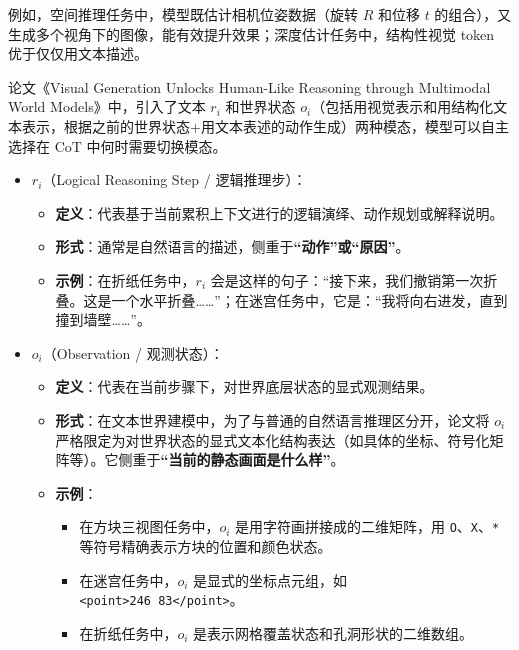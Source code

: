 例如，空间推理任务中，模型既估计相机位姿数据（旋转 \(R\) 和位移 \(t\) 的组合），又生成多个视角下的图像，能有效提升效果；深度估计任务中，结构性视觉 token 优于仅仅用文本描述。

论文《Visual Generation Unlocks Human-Like Reasoning through Multimodal World Models》中，引入了文本 \(r_i\) 和世界状态 \(o_i\)（包括用视觉表示和用结构化文本表示，根据之前的世界状态+用文本表述的动作生成）两种模态，模型可以自主选择在 CoT 中何时需要切换模态。

\begin{itemize}
\tightlist
\item
  \(r_i\)（Logical Reasoning Step / 逻辑推理步）：

  \begin{itemize}
  \tightlist
  \item
    \textbf{定义}：代表基于当前累积上下文进行的逻辑演绎、动作规划或解释说明。
  \item
    \textbf{形式}：通常是自然语言的描述，侧重于\textbf{``动作''或``原因''}。
  \item
    \textbf{示例}：在折纸任务中，\(r_i\) 会是这样的句子：``接下来，我们撤销第一次折叠。这是一个水平折叠\ldots\ldots{}''；在迷宫任务中，它是：``我将向右进发，直到撞到墙壁\ldots\ldots{}''。
  \end{itemize}
\item
  \(o_i\)（Observation / 观测状态）：

  \begin{itemize}
  \tightlist
  \item
    \textbf{定义}：代表在当前步骤下，对世界底层状态的显式观测结果。
  \item
    \textbf{形式}：在文本世界建模中，为了与普通的自然语言推理区分开，论文将 \(o_i\) 严格限定为对世界状态的显式文本化结构表达（如具体的坐标、符号化矩阵等）。它侧重于\textbf{``当前的静态画面是什么样''}。
  \item
    \textbf{示例}：

    \begin{itemize}
    \tightlist
    \item
      在方块三视图任务中，\(o_i\) 是用字符画拼接成的二维矩阵，用 \texttt{O}、\texttt{X}、\texttt{*} 等符号精确表示方块的位置和颜色状态。
    \item
      在迷宫任务中，\(o_i\) 是显式的坐标点元组，如 \texttt{\textless{}point\textgreater{}246\ 83\textless{}/point\textgreater{}}。
    \item
      在折纸任务中，\(o_i\) 是表示网格覆盖状态和孔洞形状的二维数组。
    \end{itemize}
  \end{itemize}
\end{itemize}

